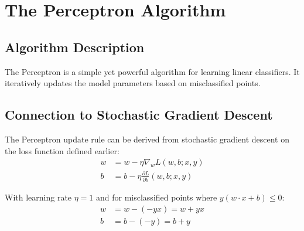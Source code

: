 \documentclass{article}
\begin{document}
\section{The Perceptron Algorithm}

\subsection{Algorithm Description}
The Perceptron is a simple yet powerful algorithm for learning linear classifiers. It iteratively updates the model parameters based on misclassified points.


\subsection{Connection to Stochastic Gradient Descent}
The Perceptron update rule can be derived from stochastic gradient descent on the loss function defined earlier:
\begin{align}
w &= w - \eta \nabla_w L(w, b; x, y) \\
b &= b - \eta \frac{\partial L}{\partial b}(w, b; x, y)
\end{align}

With learning rate $\eta = 1$ and for misclassified points where $y(w \cdot x + b) \leq 0$:
\begin{align}
w &= w - (-yx) = w + yx \\
b &= b - (-y) = b + y
\end{align}
\end{document}
